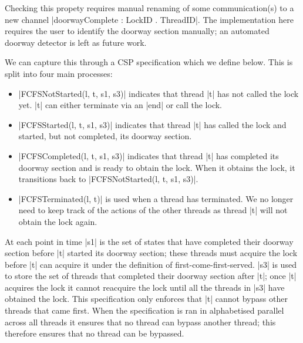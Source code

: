 Checking this propety requires manual renaming of some communication(s) to a new channel |doorwayComplete : LockID . ThreadID|. The implementation here requires the user to identify the doorway section manually; an automated doorway detector is left as future work.

We can capture this through a CSP specification which we define below. This is split into four main processes:
\begin{itemize}
  \item |FCFSNotStarted(l, t, s1, s3)| indicates that thread |t| has not called the lock yet. |t| can either terminate via an |end| or call the lock.
  \item |FCFSStarted(l, t, s1, s3)| indicates that thread |t| has called the lock and started, but not completed, its doorway section.
  \item |FCFSCompleted(l, t, s1, s3)| indicates that thread |t| has completed its doorway section and is ready to obtain the lock. When it obtains the lock, it transitions back to |FCFSNotStarted(l, t, s1, s3)|.
  \item |FCFSTerminated(l, t)| is used when a thread has terminated. We no longer need to keep track of the actions of the other threads as thread |t| will not obtain the lock again. 
\end{itemize}

At each point in time |s1| is the set of states that have completed their doorway section before |t| started its doorway section; these threads must acquire the lock before |t| can acquire it under the definition of first-come-first-served. |s3| is used to store the set of threads that completed their doorway section after |t|; once |t| acquires the lock it cannot reacquire the lock until all the threads in |s3| have obtained the lock. This specification only enforces that |t| cannot bypass other threads that came first. When the specification is ran in alphabetised parallel across all threads it ensures that no thread can bypass another thread; this therefore ensures that no thread can be bypassed.

